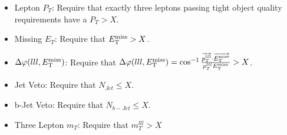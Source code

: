 \begin{itemize}
\item Lepton $P_{T}$:  Require that exactly three leptons passing tight object quality requirements have a $P_{T} > X$.
\item Missing $E_{T}$:  Require that $E_{\mathrm{T}}^{\mathrm{miss}} > X$.
\item $\Delta\varphi(lll,E_{\mathrm{T}}^{\mathrm{miss}})$:  Require that $\Delta\varphi(lll,E_{\mathrm{T}}^{\mathrm{miss}}) = \cos^{-1}\frac{ \overrightarrow{p_{T}^{lll}}\cdot\overrightarrow{E_{\mathrm{T}}^{\mathrm{miss}}} }{ p_{T}^{lll}E_{\mathrm{T}}^{\mathrm{miss}} } > X$.
\item Jet Veto: Require that $N_{Jet} \leq X$.
\item b-Jet Veto: Require that $N_{b-Jet} \leq X$.
\item Three Lepton $m_{T}$: Require that $m_{T}^{lll} > X$
\end{itemize}

